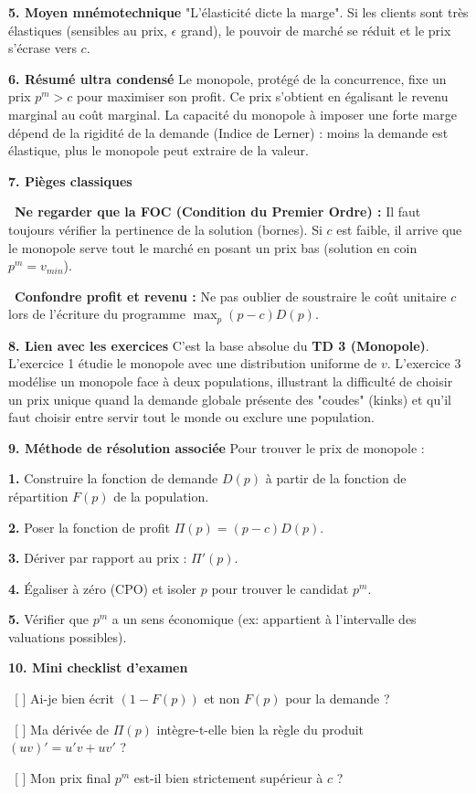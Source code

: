 \documentclass[11pt, a4paper]{report}
\begin{document}
\textbf{5. Moyen mnémotechnique}
"L'élasticité dicte la marge". Si les clients sont très élastiques (sensibles au prix, $\epsilon$ grand), le pouvoir de marché se réduit et le prix s'écrase vers $c$. 

\textbf{6. Résumé ultra condensé}
Le monopole, protégé de la concurrence, fixe un prix $p^m > c$ pour maximiser son profit. Ce prix s'obtient en égalisant le revenu marginal au coût marginal. La capacité du monopole à imposer une forte marge dépend de la rigidité de la demande (Indice de Lerner) : moins la demande est élastique, plus le monopole peut extraire de la valeur.

\textbf{7. Pièges classiques}
\par \textbullet\ \textbf{Ne regarder que la FOC (Condition du Premier Ordre) :} Il faut toujours vérifier la pertinence de la solution (bornes). Si $c$ est faible, il arrive que le monopole serve tout le marché en posant un prix bas (solution en coin $p^m = v_{min}$).
\par \textbullet\ \textbf{Confondre profit et revenu :} Ne pas oublier de soustraire le coût unitaire $c$ lors de l'écriture du programme $\max_p (p-c)D(p)$.

\textbf{8. Lien avec les exercices}
C'est la base absolue du \textbf{TD 3 (Monopole)}. L'exercice 1 étudie le monopole avec une distribution uniforme de $v$. L'exercice 3 modélise un monopole face à deux populations, illustrant la difficulté de choisir un prix unique quand la demande globale présente des "coudes" (kinks) et qu'il faut choisir entre servir tout le monde ou exclure une population.

\textbf{9. Méthode de résolution associée}
Pour trouver le prix de monopole :
\par \textbf{1.} Construire la fonction de demande $D(p)$ à partir de la fonction de répartition $F(p)$ de la population.
\par \textbf{2.} Poser la fonction de profit $\Pi(p) = (p-c)D(p)$.
\par \textbf{3.} Dériver par rapport au prix : $\Pi'(p)$.
\par \textbf{4.} Égaliser à zéro (CPO) et isoler $p$ pour trouver le candidat $p^m$.
\par \textbf{5.} Vérifier que $p^m$ a un sens économique (ex: appartient à l'intervalle des valuations possibles).

\textbf{10. Mini checklist d'examen}
\par \textbullet\ [ ] Ai-je bien écrit $(1-F(p))$ et non $F(p)$ pour la demande ?
\par \textbullet\ [ ] Ma dérivée de $\Pi(p)$ intègre-t-elle bien la règle du produit $(uv)' = u'v + uv'$ ?
\par \textbullet\ [ ] Mon prix final $p^m$ est-il bien strictement supérieur à $c$ ?
\end{document}
